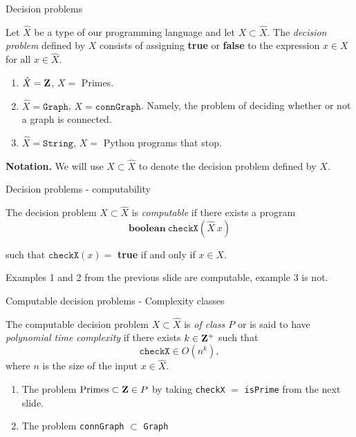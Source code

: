 %

\begin{frame}{Decision problems}
	\begin{defn}
		Let $\hat{X}$ be a type of our programming language and let
		$X \subset \hat{X}$. The \emph{decision problem} defined by $X$ consists
		of assigning \textbf{true} or \textbf{false} to the expression $x \in X$
		for all $x \in \hat{X}$. 
	\end{defn}

	\pause
	\begin{exl}
		\begin{enumerate}
			\item $\hat{X}= \mathbf{Z}$, $X=$ Primes.
			\item $\hat{X}= \mathtt{Graph}$, $X= \mathtt{connGraph}$. Namely,
				the problem of deciding whether or not a graph is
				connected.
			\item $\hat{X}= \mathtt{String}$, $X=$ Python programs that stop.
		\end{enumerate}
	\end{exl}

	\pause
	\textbf{Notation.} We will use $X \subset \hat{X}$ to denote the decision problem
	defined by $X$.
\end{frame}

%

\begin{frame}{Decision problems - computability}
	\begin{defn}
		The decision problem $X \subset \hat{X}$ is \emph{computable} if there
		exists a program
		\[
			\mathbf{boolean}\ \mathtt{checkX}(\hat{X}\ x)
		\]

		such that \(\mathtt{checkX}(x) =\) \textbf{true} if and only if
		$x \in X$.
	\end{defn}

	\pause
	\begin{exl}
		Examples 1 and 2 from the previous slide are computable, example 3 is
		not.
	\end{exl}
\end{frame}

%

\begin{frame}{Computable decision problems - Complexity classes}
	\begin{defn}
		The computable decision problem $X \subset \hat{X}$ is
		\emph{of class $P$} or is said to have \emph{polynomial time complexity}
		if there exists $k \in \mathbf{Z}^+$ such that
		\[
			\mathtt{checkX} \in O(n^k),
		\]
		where $n$ is the size of the input $x \in \hat{X}$.
	\end{defn}

	\pause
	\begin{exl}
		\begin{enumerate}
			\item The problem
				\(
					\text{Primes} \subset \mathbf{Z} \in P
				\)
				by taking \texttt{checkX} $=$ \texttt{isPrime} from the
				next slide.
			\item The problem \texttt{connGraph} $\subset$ \texttt{Graph}
		\end{enumerate}
	\end{exl}
\end{frame}

